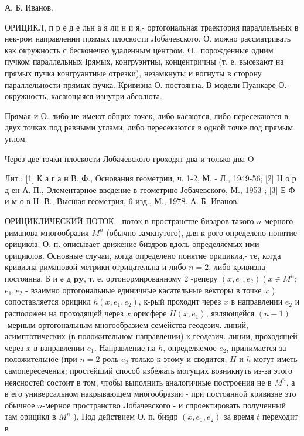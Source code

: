 \documentclass[10pt]{article}
\begin{document}
А. Б. Иванов.



ОРИЦИКЛ, п р е д е льн а я ли н и я,- ортогональная траектория параллельных в нек-ром направлении прямых плоскости Лобачевского. О. можно рассматривать как окружность с бесконечно удаленным центром. О., порожденные одним пучком параллельных Ірямых, конгруэнтны, концентричны (т. е. высекают на прямых пучка конгруәнтные отрезки), незамкнуты и вогнуты в сторону параллельности прямых пучка. Кривизна О. постоянна. В модели Пуанкаре О.- окружность, касающаяся изнутри абсолюта.



Прямая и О. либо не имеют общих точек, либо касаются, либо пересекаются в двух точках под равными углами, либо пересекаются в одной точке под прямым углом.



Через две точки плоскости Лобачевского гроходят два и только два $\mathrm{O}$



Лит.: [1] К а г а н В. Ф., Основания геометрии, ч. 1-2, М. - Л., 1949-56; [2] Н о р д ен А. П., Элементарное введение в геометрию Јобачевского, М., 1953 ; [3] Е Ф и м о в Н. В., Высшая геометрия, 6 изд., М., 1978. А. Б. Иванов.



ОРИЦИКЛИЧЕСКИЙ ПОТОК - поток в пространстве биэдров такого $n$-мерного риманова многообразия $M^{n}$ (обычно замкнутого), для к-рого определено понятие орицикла; О. п. описывает движение биэдров вдоль определяемых ими орициклов. Основные случаи, когда определено понятие орицикла,- те, когда кривизна римановой метрики отрицательна и либо $n=2$, либо кривизна постоянна. Б и ә д $\mathbf{p} \mathbf{y}$, т. е. ортонормированному 2 -реперу $\left(x, e_{1}, e_{2}\right)\left(x \in M^{n}\right.$; $e_{1}, e_{2}$ - взаимно ортогональные единичные касательные векторы в точке $x$ ), сопоставляется орицикл $h\left(x, e_{1}, e_{2}\right)$, к-рый проходит через $x$ в направлении $e_{2}$ и расположен на проходящей через $x$ орисфере $H\left(x, e_{1}\right)$, являющейся $(n-1)$-мерным ортогональным многообразием семейства геодезич. линий, асимптотических (в положительном направлении) к геодезич. линии, проходящей через $x$ в ваправлении $e_{1}$. Направление на $h$, определяемое $e_{2}$, принимается за положительное (при $n=2$ роль $e_{2}$ только к этому и сводится; $H$ и $h$ могут иметь самопересечения; простейший способ избежать могущих возникнуть из-за этого неясностей состоит в том, чтобы выполнить аналогичные построения не в $M^{n}$, а в его универсальном накрывающем многообразии - при постоянной кривизне это обычное $n$-мерное пространство Лобачевского - и спроектировать полученный там орицикл в $M^{n}$ ). Под действием О. п. биэдр $\left(x, e_{1}, e_{2}\right)$ за время $t$ переходит в
\end{document}
